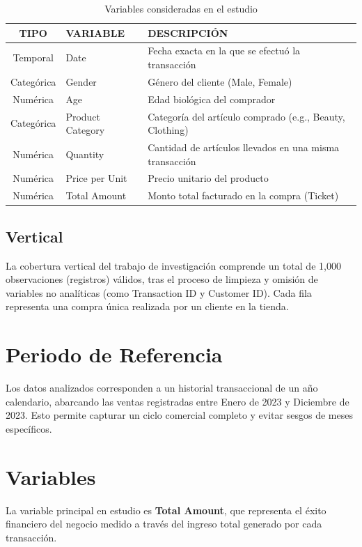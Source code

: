 \documentclass[oneside,11pt]{Latex/Classes/PhDthesisPSnPDF}
\begin{document}
\begin{table}[ht]
\centering
\caption{Variables consideradas en el estudio} 
\resizebox{12cm}{!} {
\begin{tabular}{cll}
  \hline
  \textbf{TIPO} & \textbf{VARIABLE} & \textbf{DESCRIPCIÓN} \\ 
  \hline
Temporal & Date & Fecha exacta en la que se efectuó la transacción \\
Categórica & Gender & Género del cliente (Male, Female) \\
Numérica & Age & Edad biológica del comprador \\
Categórica & Product Category & Categoría del artículo comprado (e.g., Beauty, Clothing) \\
Numérica & Quantity & Cantidad de artículos llevados en una misma transacción \\
Numérica & Price per Unit & Precio unitario del producto \\
Numérica & Total Amount & Monto total facturado en la compra (Ticket) \\
   \hline
\end{tabular}
}
\end{table}

\subsection{Vertical}

La cobertura vertical del trabajo de investigación comprende un total de
1,000 observaciones (registros) válidos, tras el proceso de limpieza y
omisión de variables no analíticas (como Transaction ID y Customer ID).
Cada fila representa una compra única realizada por un cliente en la
tienda.

\section{Periodo de Referencia}

Los datos analizados corresponden a un historial transaccional de un año
calendario, abarcando las ventas registradas entre Enero de 2023 y
Diciembre de 2023. Esto permite capturar un ciclo comercial completo y
evitar sesgos de meses específicos.

\section{Variables}

La variable principal en estudio es \textbf{Total Amount}, que
representa el éxito financiero del negocio medido a través del ingreso
total generado por cada transacción.
\end{document}
